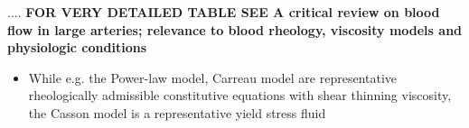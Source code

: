 \documentclass[11pt,letterpaper]{article}
\begin{document}
....
{\color{red} \textbf{FOR VERY DETAILED TABLE SEE A critical review on blood flow in large arteries; relevance to blood rheology, viscosity models and physiologic conditions \cite{FuatYilmazandMehmetYasarGundogdu2008_largetable} }}

\begin{itemize}
\item While e.g. the Power-law model, Carreau model are representative rheologically admissible constitutive equations with shear thinning viscosity, the Casson model is a representative yield stress fluid
\end{itemize}





\newpage
\end{document}
